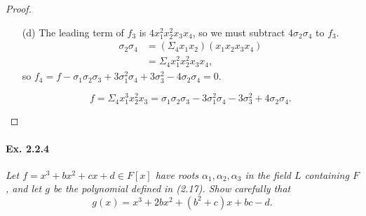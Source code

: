 \documentclass[11pt,a4paper]{article}
\begin{document}
\begin{proof}
\begin{enumerate}
\item[(d)]  The leading term of $f_3$ is $4x_1^2x_2^2x_3x_4$, so we must subtract $ 4\sigma_2 \sigma_4$ to $f_3$.
\begin{align*}
\sigma_2 \sigma_4 &= (\Sigma_4 x_1x_2) (x_1x_2x_3x_4)\\
&=\Sigma_4x_1^2x_2^2x_3x_4,
\end{align*}
so $f_4 = f - \sigma_1\sigma_2\sigma_3 +3 \sigma_1^2 \sigma_4 +3\sigma_3^2 - 4\sigma_2 \sigma_4 = 0$.

$$f = \Sigma_4x_1^3x_2^2x_3 = \sigma_1\sigma_2\sigma_3 -3 \sigma_1^2 \sigma_4 -3\sigma_3^2 + 4\sigma_2 \sigma_4.$$ 
\end{enumerate}
\end{proof}

\paragraph{Ex. 2.2.4}

{\it Let $f = x^3+bx^2+cx+d \in F[x]$ have roots $\alpha_1,\alpha_2,\alpha_3$ in the field $L$ containing $F$, and let $g$ be the polynomial defined in (2.17). Show carefully that
$$g(x) = x^3 + 2bx^2 + (b^2+c)x +bc-d.$$
}
\end{document}
